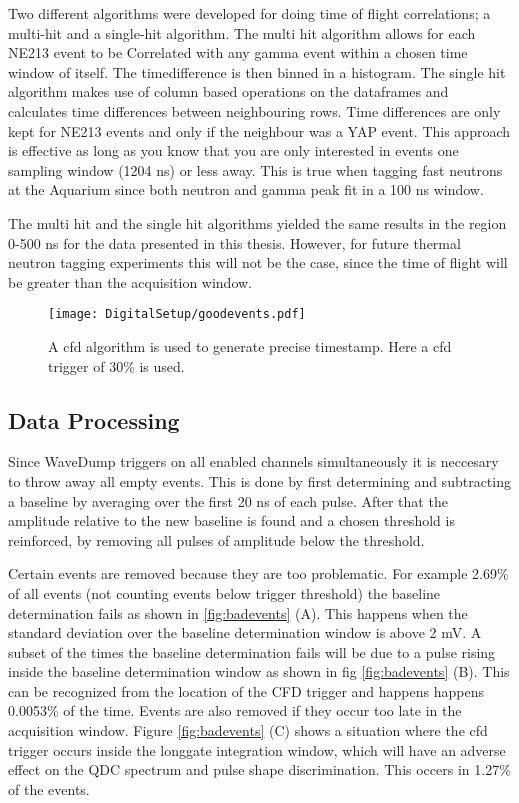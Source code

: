 \documentclass[main.tex]{subfiles}
\begin{document}
Two different algorithms were developed for doing time of flight correlations; a multi-hit and a single-hit algorithm. The multi hit algorithm allows for each NE213 event to be Correlated with any gamma event within a chosen time window of itself. The timedifference is then binned in a histogram. 
The single hit algorithm makes use of column based operations on the dataframes and calculates time differences between neighbouring rows. Time differences are only kept for NE213 events and only if the neighbour was a YAP event. This approach is effective as long as you know that you are only interested in events one sampling window (1204 ns) or less away. This is true when tagging fast neutrons at the Aquarium since both neutron and gamma peak fit in a 100 ns window. 

The multi hit and the single hit algorithms yielded the same results in the region 0-500 ns for the data presented in this thesis. However, for future thermal neutron tagging experiments this will not be the case, since the time of flight will be greater than the acquisition window.
\begin{figure}[ht!]
    \centering
        \texttt{[image: DigitalSetup/goodevents.pdf]}
        \caption{A cfd algorithm is used to generate precise timestamp. Here a cfd trigger of 30\% is used.}
    \label{fig:cfd_trig} 
\end{figure}

\subsection{Data Processing}
Since WaveDump triggers on all enabled channels simultaneously it is neccesary to throw away all empty events. This is done by first determining and subtracting a baseline by averaging over the first 20 ns of each pulse. After that the amplitude relative to the new baseline is found and a chosen threshold is reinforced, by removing all pulses of amplitude below the threshold.

Certain events are removed because they are too problematic. For example 2.69\% of all events (not counting events below trigger threshold) the baseline determination fails as shown in \ref{fig:badevents} (A). This happens when the standard deviation over the baseline determination window is above 2 mV. 
A subset of the times the baseline determination fails will be due to a pulse rising inside the baseline determination window as shown in fig \ref{fig:badevents} (B). This can be recognized from the location of the CFD trigger and happens happens 0.0053\% of the time. Events are also removed if they occur too late in the acquisition window. Figure \ref{fig:badevents} (C) shows a situation where the cfd trigger occurs inside the longgate integration window, which will have an adverse effect on the QDC spectrum and pulse shape discrimination. This occers in 1.27\% of the events.
\end{document}
